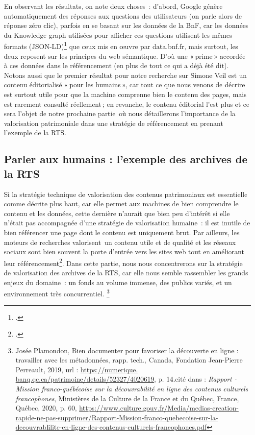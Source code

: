 En observant les résultats, on note deux choses : d’abord, Google génère automatiquement des réponses aux questions des utilisateurs (on parle alors de réponse zéro clic), parfois en se basant sur les données de la BnF, car les données du Knowledge graph utilisées pour afficher ces questions utilisent les mêmes formats (JSON-LD)\footcite{zotero-235} que ceux mis en œuvre par data.bnf.fr, mais surtout, les deux reposent sur les principes du web sémantique. D’où une « prime » accordée à ces données dans le référencement (en plus de tout ce qui a déjà été dit). Notons aussi que le premier résultat pour notre recherche sur Simone Veil est un contenu éditorialisé « pour les humains », car tout ce que nous venons de décrire est surtout utile pour que la machine comprenne bien le contenu des pages, mais est rarement consulté réellement ; en revanche, le contenu éditorial l’est plus et ce sera l’objet de notre prochaine partie où nous détaillerons l’importance de la valorisation patrimoniale dans une stratégie de référencement en prenant l’exemple de la RTS.

\subsection{Parler aux humains : l'exemple des archives de la RTS}

Si la stratégie technique de valorisation des contenus patrimoniaux est essentielle comme décrite plus haut, car elle permet aux machines de bien comprendre le contenu et les données, cette dernière n’aurait que bien peu d’intérêt si elle n’était pas accompagnée d’une stratégie de valorisation humaine : il est inutile de bien référencer une page dont le contenu est uniquement brut. Par ailleurs, les moteurs de recherches valorisent un contenu utile et de qualité et les réseaux sociaux sont bien souvent la porte d’entrée vers les sites web tout en améliorant leur référencement\footcite{laura2022}. Dans cette partie, nous nous concentrerons sur la stratégie de valorisation des archives de la RTS, car elle nous semble rassembler les grands enjeux du domaine : un fonds au volume immense, des publics variés, et un environnement très concurrentiel.
\footnote{Josée Plamondon, Bien documenter pour favoriser la découverte en ligne : travailler avec les métadonnées, rapp. tech., Canada, Fondation Jean-Pierre Perreault, 2019, url : \url{https://numerique.
		banq.qc.ca/patrimoine/details/52327/4020619}, p. 14.cité dans : \textit{Rapport - Mission franco-québécoise sur la découvrabilité en ligne des contenus culturels francophones}, Ministères de la Culture de la France et du Québec, France, Québec, 2020, p. 60, \url{https://www.culture.gouv.fr/Media/medias-creation-rapide-ne-pas-supprimer/Rapport-Mission-franco-quebecoise-sur-la-decouvrablilite-en-ligne-des-contenus-culturels-francophones.pdf}}



